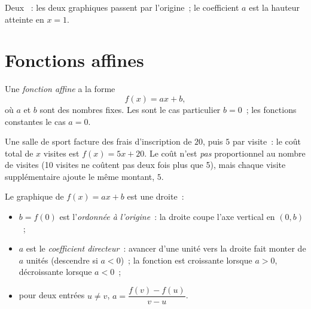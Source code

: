 \begin{omfigure}

{\small Deux ~: les deux graphiques passent par
l'origine~; le coefficient $a$ est la hauteur atteinte en $x = 1$.}
\end{omfigure}

\section{Fonctions affines}

\begin{definition}\label{def:g9:linfunc:affine}
Une \emph{fonction affine} a la forme
\[
f(x) = a x + b ,
\]
où $a$ et $b$ sont des nombres fixes. Les  sont le cas
particulier $b = 0$~; les fonctions constantes le cas $a = 0$.
\end{definition}

\begin{example}
Une salle de sport facture des frais d'inscription de $20$, puis $5$ par
visite~: le coût total de $x$ visites est $f(x) = 5x + 20$. Le coût
n'est \emph{pas} proportionnel au nombre de visites (10 visites ne
coûtent pas deux fois plus que 5), mais chaque visite supplémentaire
ajoute le même montant, $5$.
\end{example}

\begin{proposition}\label{prop:g9:linfunc:affinegraph}
Le graphique de $f(x) = ax + b$ est une droite~:
\begin{itemize}
  \item $b = f(0)$ est l'\emph{ordonnée à l'origine}~: la droite coupe
        l'axe vertical en $(0, b)$~;
  \item $a$ est le \emph{coefficient directeur}~: avancer d'une unité vers la droite fait monter de
        $a$ unités (descendre si $a < 0$)~; la fonction est croissante
        lorsque $a > 0$, décroissante lorsque $a < 0$~;
  \item pour deux entrées $u \neq v$,
        $a = \dfrac{f(v) - f(u)}{v - u}$.
\end{itemize}
\end{proposition}

